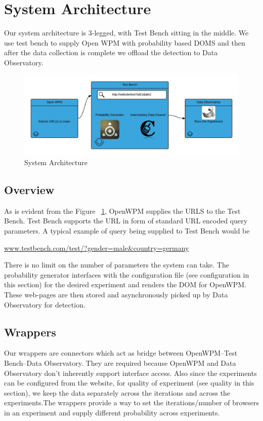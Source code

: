\documentclass[fleqn,12pt]{SelfArx} %
\begin{document}
\section{System Architecture}
Our system architecture is 3-legged, with Test Bench sitting in the middle. We use test bench to supply Open WPM with probability based DOMS and then after the data collection is complete we offload the detection to Data Observatory. 
\begin{figure}[h!]
	\includegraphics[width=\linewidth]{architecture.jpg}
    \caption{System Architecture}
    \label{fig:architecture}
\end{figure}
\subsection{Overview}
As is evident from the Figure ~\ref{fig:architecture}, OpenWPM supplies the URLS to the Test Bench. Test Bench supports the URL in form of standard URL encoded query parameters. A typical example of query being supplied to Test Bench would be 
\begin{center}
\url{www.testbench.com/test/?gender=male&country=germany}
\end{center}
There is no limit on the number of parameters the system can take. The probability generator interfaces with the configuration file (see configuration in this section) for the desired experiment and renders the DOM for OpenWPM. These web-pages are then stored and asynchronously picked up by Data Observatory for detection.
\subsection{Wrappers}
Our wrappers are connectors which act as bridge between OpenWPM--Test Bench--Data Observatory. They are required because OpenWPM and Data Observatory don’t inherently support interface access. Also since the experiments can be configured from the website, for quality of experiment (see quality in this section), we keep the data separately across the iterations and across the experiments.The wrappers provide a way to set the iterations/number of browsers in an experiment and supply different probability across experiments.
\end{document}
